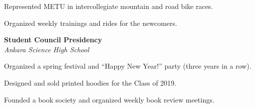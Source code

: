 \documentclass{article}
\begin{document}
    
    \noindent Represented METU in intercollegiate mountain and road bike races.
 
 \noindent Organized weekly trainings and rides for the newcomers.
    
    \medskip

    \noindent \textbf{Student Council Presidency}
    \\ \textit{ Ankara Science High School } 
    
    
    \noindent Organized a spring festival and ``Happy New Year!'' party (three years in a row).
 
 \noindent Designed and sold printed hoodies for the Class of 2019.
 
 \noindent Founded a book society and organized weekly book review meetings.
    
    \medskip




%
%
%
%
%
%
%
%
%
%
%
%
%
\end{document}
